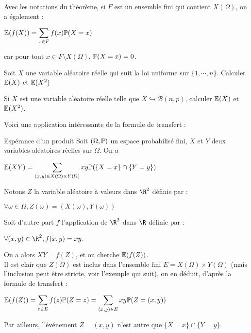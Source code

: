 \documentclass[12pt,a4paper]{report}
\begin{document}
\begin{remarque}{}
Avec les notations du théorème, si $F$ est un ensemble fini qui contient $X(\Omega)$, on a également :
\begin{center}
$\mathbb{E}(f(X)) = \displaystyle \sum_{x \in F} f(x) \mathbb{P}(X=x)$
\end{center}
car pour tout $x \in F \setminus X(\Omega)$, $\mathbb{P}(X=x) = 0$.
\end{remarque}

\begin{exemple}[Exercice 13]{}
Soit $X$ une variable aléatoire réelle qui suit la loi uniforme sur $\{1,\cdots,n\}$. Calculer $\mathbb{E}(X)$ et $\mathbb{E}(X^2)$
\end{exemple}

\begin{exemple}[Exercice 14]{}
Si $X$ est une variable aléatoire réelle telle que $X \hookrightarrow \mathcal{B}(n,p)$, calculer $\mathbb{E}(X)$ et $\mathbb{E}(X^2)$.
\end{exemple}

Voici une application intéressante de la formule de transfert :
\begin{proposition}{Espérance d'un produit}{}
Soit $(\Omega, \mathbb{P})$ un espace probabilisé fini, $X$ et $Y$ deux variables aléatoires réelles sur $\Omega$. On a
\begin{center}
$\mathbb{E}(XY) = \displaystyle \sum_{(x,y) \in X(\Omega) \times Y(\Omega)} xy \mathbb{P}(\{X = x\} \cap \{Y = y\})$
\end{center}
\end{proposition}

\begin{demo}{}
Notons $Z$ la variable aléatoire à valeurs dans $\R^2$ définie par :
\begin{center}
$\forall \omega \in \Omega, Z(\omega) = (X(\omega),Y(\omega))$
\end{center}

Soit d'autre part $f$ l'application de $\R^2$ dans $\R$ définie par :
\begin{center}
$\forall (x,y) \in \R^2, f(x,y) = xy$.
\end{center}

On a alors $XY = f(Z)$, et on cherche $\mathbb{E}(f(Z))$. \\

Il est clair que $Z(\Omega)$ est inclus dans l'ensemble fini $E = X(\Omega) \times Y(\Omega)$ (mais l'inclusion peut être stricte, voir l'exemple qui suit), on en déduit, d'après la formule de transfert : 
\begin{center}
$\mathbb{E}(f(Z)) = \displaystyle \sum_{z \in E} f(z) \mathbb{P}(Z=z) = \sum_{(x,y) \in E} xy \mathbb{P}(Z=(x,y))$
\end{center}

Par ailleurs, l'événement $Z=(x,y)$ n'est autre que $\{X = x\} \cap \{Y = y\}$.
\end{demo}
\end{document}
